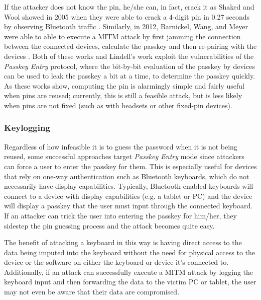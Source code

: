 \documentclass{acm_proc_article-sp}
\begin{document}
If the attacker does not know the pin, he/she can, in fact, crack it as Shaked and Wool showed in 2005 when they were able to crack a 4-digit pin in 0.27 seconds by observing Bluetooth traffic \cite{shaked2005cracking}. Similarly, in 2012, Barnickel, Wang, and Meyer were able to able to execute a MITM attack by first jamming the connection between the connected devices, calculate the passkey and then re-pairing with the devices \cite{barnickel2012implementing}. Both of these works and Lindell's work exploit the vulnerabilities of the \textit{Passkey Entry} protocol, where the bit-by-bit evaluation of the passkey by devices can be used to leak the passkey a bit at a time, to determine the passkey quickly. As these works show, computing the pin is alarmingly simple and fairly useful when pins are reused; currently, this is still a feasible attack, but is less likely when pins are not fixed (such as with headsets or other fixed-pin devices).

\subsubsection{Keylogging}
Regardless of how infeasible it is to guess the password when it is not being reused, some successful approaches target \textit{Passkey Entry} mode since attackers can force a user to enter the passkey for them. This is especially useful for devices that rely on one-way authentication such as Bluetooth keyboards, which do not necessarily have display capabilities. Typically, Bluetooth enabled keyboards will connect to a device with display capabilities (e.g. a tablet or PC) and the device will display a passkey that the user must input through the connected keyboard. If an attacker can trick the user into entering the passkey for him/her, they sidestep the pin guessing process and the attack becomes quite easy. 

The benefit of attacking a keyboard in this way is having direct access to the data being imputed into the keyboard without the need for physical access to the device or the software on either the keyboard or device it's connected to. Additionally, if an attack can successfully execute a MITM attack by logging the keyboard input and then forwarding the data to the victim PC or tablet, the user may not even be aware that their data are compromised. 
\end{document}
